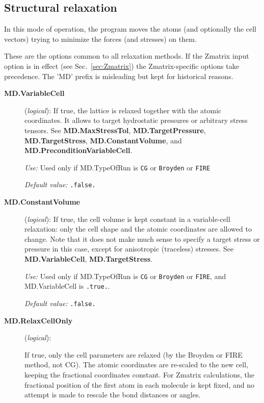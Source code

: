 \subsection{Structural relaxation}

In this mode of operation, the program moves the atoms (and optionally
the cell vectors) trying to minimize the forces (and stresses) on
them.

These are the options common to all relaxation methods. If the Zmatrix
input option is in effect (see Sec.~\ref{sec:Zmatrix}) the
Zmatrix-specific options take precedence.  The 'MD' prefix is
misleading but kept for historical reasons.

\begin{description}
\item[\textbf{MD.VariableCell}] (\textit{logical}):
    If true, the lattice is relaxed together with the
  atomic coordinates. It allows to target hydrostatic pressures or
  arbitrary stress tensors.  See \textbf{MD.MaxStressTol}, \textbf{MD.TargetPressure}, \textbf{MD.TargetStress}, \textbf{MD.ConstantVolume}, and \textbf{MD.PreconditionVariableCell}.

\textit{Use:} Used only if MD.TypeOfRun is \texttt{CG} or \texttt{Broyden} or
\texttt{FIRE}

\textit{Default value:} \texttt{.false.}

\item[\textbf{MD.ConstantVolume}] (\textit{logical}):
   If true, the cell volume is
  kept constant in a variable-cell relaxation: only the cell shape and
  the atomic coordinates are allowed to change.  Note that it does not
  make much sense to specify a target stress or pressure in this case,
  except for anisotropic (traceless) stresses.  See \textbf{MD.VariableCell}, \textbf{MD.TargetStress}.

\textit{Use:} Used only if MD.TypeOfRun is \texttt{CG} or \texttt{Broyden} or
\texttt{FIRE},  and  MD.VariableCell is \texttt{.true.}.

\textit{Default value:} \texttt{.false.}

\item[\textbf{MD.RelaxCellOnly}] (\textit{logical}):
 

If true, only the cell parameters are relaxed (by the Broyden or FIRE
method, not CG).  The atomic coordinates are re-scaled to the new
cell, keeping the fractional coordinates constant. For Zmatrix
calculations, the fractional position of the first atom in each
molecule is kept fixed, and no attempt is made to rescale the bond
distances or angles.


\end{description}
